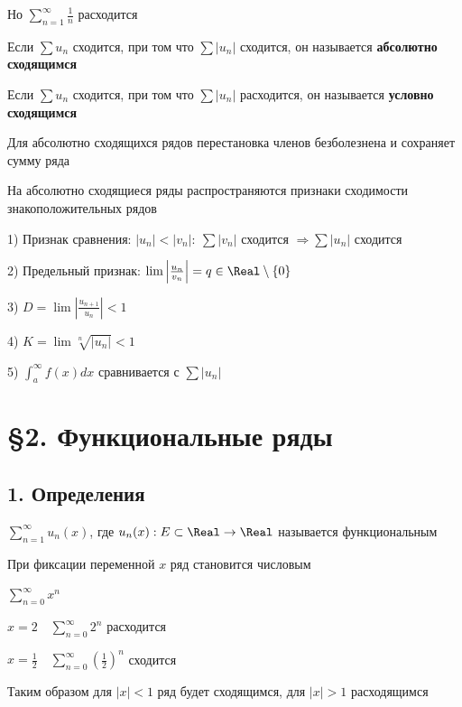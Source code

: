 \documentclass[12pt]{article}
\begin{document}
    Но $\sum_{n = 1}^\infty \frac{1}{n}$ расходится

    \Def Если $\sum u_n$ сходится, при том что $\sum |u_n|$ сходится, он называется \textbf{абсолютно сходящимся}

    \hypertarget{conditionalconvergence}{}

    \Defs Если $\sum u_n$ сходится, при том что $\sum |u_n|$ расходится, он называется \textbf{условно сходящимся}

    \Notas Для абсолютно сходящихся рядов перестановка членов безболезнена и сохраняет сумму ряда

    \Notas На абсолютно сходящиеся ряды распространяются признаки сходимости знакоположительных рядов

    1) Признак сравнения: $|u_n| < |v_n|: \ \sum |v_n|$ сходится $\Longrightarrow \sum |u_n|$ сходится

    2) Предельный признак: $\lim \left|\frac{u_n}{v_n}\right| = q \in \Real \setminus \{0\}$

    3) $D = \lim \left|\frac{u_{n + 1}}{u_n}\right| < 1$

    4) $K = \lim \sqrt[n]{|{u_n}|} < 1$

    5) $\int_a^\infty f(x)dx$ сравнивается с $\sum |u_n|$

    \clearpage


    \section{\S 2. Функциональные ряды}

    \hypertarget{functionalseries}{}

    \subsection{1. Определения}

    \Def $\sum_{n = 1}^\infty u_n(x)$, где $u_n(x) : E \subset \Real \to \Real$ называется функциональным

    \Notas При фиксации переменной $x$ ряд становится числовым

    \Exs $\sum_{n = 0}^\infty x^n$

    $x = 2 \quad \sum_{n = 0}^\infty 2^n$ расходится

    $x = \frac{1}{2} \quad \sum_{n = 0}^\infty \left(\frac{1}{2}\right)^n$ сходится

    Таким образом для $|x| < 1$ ряд будет сходящимся, для $|x| > 1$ расходящимся
\end{document}
